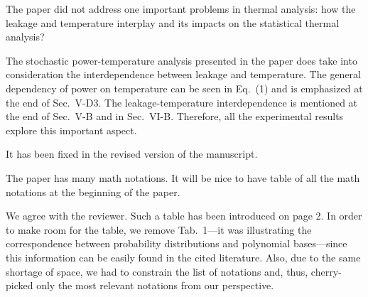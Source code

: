 \begin{reviewer}
[Comment 6] The paper did not address one important problems in thermal analysis: how the leakage and temperature interplay and its impacts on the statistical thermal analysis?
\end{reviewer}
\begin{authors}
The stochastic power-temperature analysis presented in the paper does take into consideration the interdependence between leakage and temperature.
The general dependency of power on temperature can be seen in Eq.~(1) and is emphasized at the end of Sec.~V-D3.
The leakage-temperature interdependence is mentioned at the end of Sec.~V-B and in Sec.~VI-B.
Therefore, all the experimental results explore this important aspect.

It has been fixed in the revised version of the manuscript.

\begin{actions}
\end{actions}
\end{authors}

\begin{reviewer}
[Comment 7] The paper has many math notations. It will be nice to have table of all the math notations at the beginning of  the paper.
\end{reviewer}
\begin{authors}
We agree with the reviewer.
Such a table has been introduced on page 2.
In order to make room for the table, we remove Tab.~1---it was illustrating the correspondence between probability distributions and polynomial bases---since this information can be easily found in the cited literature.
Also, due to the same shortage of space, we had to constrain the list of notations and, thus, cherry-picked only the most relevant notations from our perspective.

\begin{actions}
\end{actions}
\end{authors}

